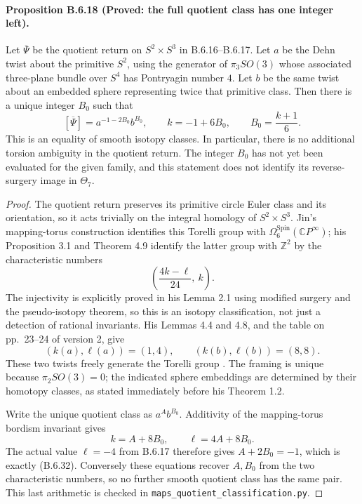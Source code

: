 \paragraph{Proposition B.6.18 (Proved: the full quotient class has one integer left).}
Let $\overline\Psi$ be the quotient return on $S^2\times S^3$
in B.6.16--B.6.17.  Let $a$ be the Dehn twist about the primitive
$S^2$, using the generator of $\pi_3SO(3)$ whose associated
three-plane bundle over $S^4$ has Pontryagin number $4$.
Let $b$ be the same twist about an embedded sphere representing
twice that primitive class.  Then there is a unique integer $B_0$
such that
\[
 [\overline\Psi]=a^{-1-2B_0}b^{B_0},\qquad
 k=-1+6B_0,\qquad B_0=\frac{k+1}{6}.
 \tag{B.6.32}
\]
This is an equality of smooth isotopy classes.  In particular,
there is no additional torsion ambiguity in the quotient return.
The integer $B_0$ has not yet been evaluated for the given family,
and this statement does not identify its reverse-surgery image
in $\Theta_7$.
\begin{proof}
The quotient return preserves its primitive circle Euler class
and its orientation, so it acts trivially on the integral
homology of $S^2\times S^3$.  Jin's mapping-torus construction
identifies this Torelli group with
$\Omega^{\operatorname{Spin}}_6(\mathbb CP^\infty)$;
his Proposition 3.1 and Theorem 4.9 identify the latter group
with $\mathbb Z^2$ by the characteristic numbers
\[
 \left(\frac{4k-\ell}{24},\ k\right).
\]
The injectivity is explicitly proved in his Lemma 2.1 using
modified surgery and the pseudo-isotopy theorem, so this is
an isotopy classification, not just a detection of rational
invariants.  His Lemmas 4.4 and 4.8, and the table on
pp.~23--24 of version 2, give
\[
 (k(a),\ell(a))=(1,4),\qquad
 (k(b),\ell(b))=(8,8).
\]
These two twists freely generate the Torelli group
\cite[Corollary 1.3 and Theorem 4.9]{mapsJin26}.
The framing is unique because $\pi_2SO(3)=0$; the indicated
sphere embeddings are determined by their homotopy classes,
as stated immediately before his Theorem 1.2.

Write the unique quotient class as $a^A b^{B_0}$.  Additivity
of the mapping-torus bordism invariant gives
\[
                  k=A+8B_0,\qquad \ell=4A+8B_0.
\]
The actual value $\ell=-4$ from B.6.17 therefore gives
$A+2B_0=-1$, which is exactly (B.6.32).  Conversely these
equations recover $A,B_0$ from the two characteristic numbers,
so no further smooth quotient class has the same pair.
This last arithmetic is checked in
\texttt{maps\_quotient\_classification.py}.
\end{proof}

